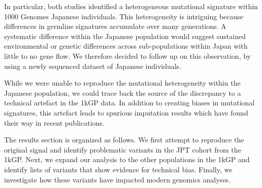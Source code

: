 \documentclass[9pt,lineno]{elife}
\begin{document}
 In particular, both studies  identified a heterogeneous mutational signature within 1000 Genomes Japanese individuals.
This heterogeneity is intriguing because differences in germline signatures accumulate over many generations.
A systematic difference within the Japanese population would suggest sustained environmental or genetic differences across sub-populations within Japan with little to no gene flow.
We therefore decided to follow up on this observation, by using a newly sequenced dataset of Japanese individuals. 

While we were unable to reproduce the mutational heterogeneity within the Japanese population, we could trace back the source of the discrepancy to a technical artefact in the 1kGP data.
In addition to creating biases in mutational signatures, this artefact leads to spurious imputation results which have found their way in recent publications.


The results section is organized as follows.
We first attempt to reproduce the original signal and identify problematic variants in the JPT cohort from the 1kGP. 
Next, we expand our analysis to the other populations in the 1kGP and identify lists of variants that show evidence for technical bias.
Finally, we investigate how these variants have impacted modern genomics analyses.  
  
\end{document}
